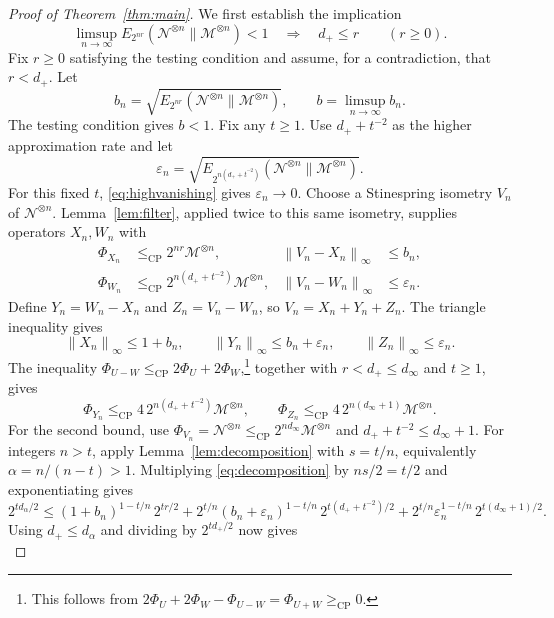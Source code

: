 \documentclass[10pt,a4paper]{amsart}
\newcommand{\M}{\mathcal M}
\newcommand{\N}{\mathcal N}
\newcommand{\cp}{\mathrm{CP}}
\newcommand{\norm}[1]{\left\lVert#1\right\rVert}
\theoremstyle{plain}
\begin{document}
\begin{proof}[Proof of Theorem~\ref{thm:main}]
We first establish the implication
\begin{equation}\label{eq:thresholdcriterion}
 \limsup_{n\to\infty}E_{2^{nr}}(\N^{\otimes n}\|\M^{\otimes n})<1
 \quad\Longrightarrow\quad d_+\le r\qquad(r\ge0).
\end{equation}
Fix $r\ge0$ satisfying the testing condition and assume, for a contradiction, that $r<d_+$. Let
\[
 b_n=\sqrt{E_{2^{nr}}(\N^{\otimes n}\|\M^{\otimes n})},
 \qquad b=\limsup_{n\to\infty}b_n.
\]
The testing condition gives $b<1$. Fix any $t\ge1$. Use $d_++t^{-2}$ as the higher approximation rate and let
\[
 \varepsilon_n=\sqrt{E_{2^{n(d_++t^{-2})}}(\N^{\otimes n}\|\M^{\otimes n})}.
\]
For this fixed $t$, \eqref{eq:highvanishing} gives $\varepsilon_n\to0$. Choose a Stinespring isometry $V_n$ of $\N^{\otimes n}$. Lemma~\ref{lem:filter}, applied twice to this same isometry, supplies operators $X_n,W_n$ with
\begin{align}
 \Phi_{X_n}&\le_{\cp}2^{nr}\M^{\otimes n},
 &\norm{V_n-X_n}_\infty&\le b_n,\label{eq:lowapprox}\\
 \Phi_{W_n}&\le_{\cp}2^{n(d_++t^{-2})}\M^{\otimes n},
 &\norm{V_n-W_n}_\infty&\le\varepsilon_n.
 \label{eq:highapprox}
\end{align}
Define $Y_n=W_n-X_n$ and $Z_n=V_n-W_n$, so $V_n=X_n+Y_n+Z_n$. The triangle inequality gives
\[
 \norm{X_n}_\infty\le1+b_n,\qquad
 \norm{Y_n}_\infty\le b_n+\varepsilon_n,\qquad
 \norm{Z_n}_\infty\le\varepsilon_n.
\]
The inequality $\Phi_{U-W}\le_{\cp}2\Phi_U+2\Phi_W$,\footnote{This follows from $2\Phi_U+2\Phi_W-\Phi_{U-W}=\Phi_{U+W}\ge_{\cp}0$.} together with $r<d_+\le d_\infty$ and $t\ge1$, gives
\begin{equation}\label{eq:threecaps}
 \Phi_{Y_n}\le_{\cp}4\,2^{n(d_++t^{-2})}\M^{\otimes n},
 \qquad
 \Phi_{Z_n}\le_{\cp}4\,2^{n(d_\infty+1)}\M^{\otimes n}.
\end{equation}
For the second bound, use $\Phi_{V_n}=\N^{\otimes n}\le_{\cp}2^{nd_\infty}\M^{\otimes n}$ and $d_++t^{-2}\le d_\infty+1$.
For integers $n>t$, apply Lemma~\ref{lem:decomposition} with $s=t/n$, equivalently $\alpha=n/(n-t)>1$. Multiplying \eqref{eq:decomposition} by $ns/2=t/2$ and exponentiating gives
\[
 2^{td_\alpha/2}\le(1+b_n)^{1-t/n}\,2^{tr/2}
 +2^{t/n}(b_n+\varepsilon_n)^{1-t/n}\,2^{t(d_++t^{-2})/2}
 +2^{t/n}\varepsilon_n^{1-t/n}\,2^{t(d_\infty+1)/2}.
\]
Using $d_+\le d_\alpha$ and dividing by $2^{td_+/2}$ now gives
\begin{equation}\label{eq:threepiecebound}

\end{equation}
\end{proof}
\end{document}
